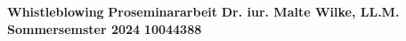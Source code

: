 
\noindent
\begin{center}
    \vspace*{9cm}
    \textbf{Whistleblowing}
    \bigbreak
    \bigbreak
    \bigbreak
    \textbf{Proseminararbeit}
    \bigbreak
    \bigbreak
    \textbf{Dr. iur. Malte Wilke, LL.M.}
    \bigbreak
    \bigbreak
    \textbf{Sommersemster 2024}
    \bigbreak
    \bigbreak
    \textbf{10044388}
\end{center}

\newpage